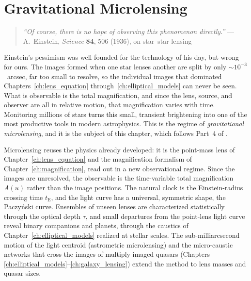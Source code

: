 
\chapter{Gravitational Microlensing}
\label{ch:microlensing}

\begin{quote}
\textit{``Of course, there is no hope of observing this phenomenon
directly.''}
\hfill --- A.~Einstein, \textit{Science} \textbf{84}, 506 (1936), on star--star lensing
\end{quote}

\noindent
Einstein's pessimism \citep{einstein_1936} was well founded for the
technology of his day, but wrong for ours.  The images formed when one star
lenses another are split by only $\sim\!10^{-3}$~arcsec, far too small to
resolve, so the
individual images that dominated Chapters~\ref{ch:lens_equation}
through~\ref{ch:elliptical_models} can never be seen.  What is
observable is the total magnification, and since the lens, source,
and observer are all in relative motion, that magnification varies with time.
Monitoring millions of stars turns this small, transient brightening into one
of the most productive tools in modern astrophysics.  This is the regime of
\emph{gravitational microlensing}, and it is the subject of this chapter,
which follows Part~4 of \citet{schneider_kochanek_wambsganss_2006}.

Microlensing reuses the physics already developed: it is the point-mass
lens of Chapter~\ref{ch:lens_equation} and the magnification formalism of
Chapter~\ref{ch:magnification}, read out in a new observational regime.
Since the images are unresolved, the observable is the time-variable total
magnification $A(u)$ rather than the image positions.  The natural clock is
the Einstein-radius crossing time $t_{\mathrm{E}}$, and the light curve has
a universal, symmetric shape, the Paczy\'nski curve.  Ensembles of unseen
lenses are characterized statistically through the optical depth $\tau$,
and small departures from the point-lens light curve reveal binary
companions and planets, through the caustics of
Chapter~\ref{ch:elliptical_models} realized at stellar scales.  The
sub-milliarcsecond motion of the light centroid (astrometric microlensing)
and the micro-caustic networks that cross the images of multiply imaged
quasars (Chapters~%
\ref{ch:elliptical_models}--\ref{ch:galaxy_lensing}) extend the
method to lens masses and quasar sizes.

